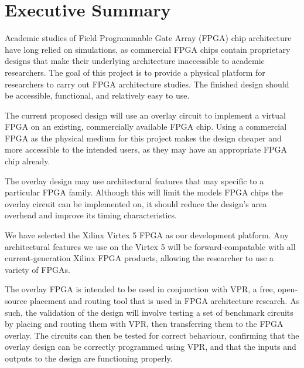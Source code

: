 \thispagestyle{empty}
\section*{Executive Summary}


Academic studies of Field Programmable Gate Array (FPGA) chip architecture have long relied on simulations, as commercial FPGA chips contain proprietary designs that make their underlying architecture inaccessible to academic researchers.
The goal of this project is to provide a physical platform for researchers to carry out FPGA architecture studies.
The finished design should be accessible, functional, and relatively easy to use.

The current proposed design will use an overlay circuit to implement a virtual FPGA on an existing, commercially available FPGA chip.
Using a commercial FPGA as the physical medium for this project makes the design cheaper and more accessible to the intended users, as they may have an appropriate FPGA chip already.

The overlay design may use architectural features that may specific to a particular FPGA family.
Although this will limit the models FPGA chips the overlay circuit can be implemented on, it should reduce the design's area overhead and improve its timing characteristics.

We have selected the Xilinx Virtex 5 FPGA as our development platform.
Any architectural features we use on the Virtex 5 will be forward-compatable with all current-generation Xilinx FPGA products, allowing the researcher to use a variety of FPGAs.

The overlay FPGA is intended to be used in conjunction with VPR, a free, open-source placement and routing tool that is used in FPGA architecture research.
As such, the validation of the design will involve testing a set of benchmark circuits by placing and routing them with VPR, then transferring them to the FPGA overlay.
The circuits can then be tested for correct behaviour, confirming that the overlay design can be correctly programmed using VPR, and that the inputs and outputs to the design are functioning properly.

